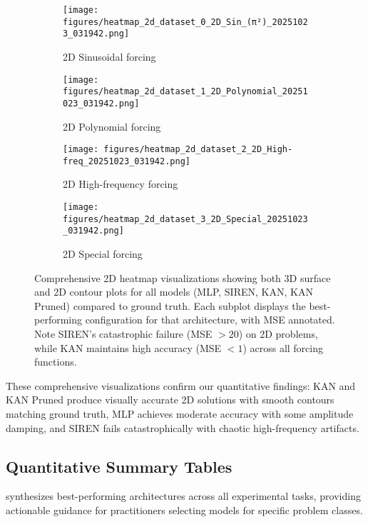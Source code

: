 \documentclass[11pt,a4paper]{article}
\begin{document}
\begin{figure}[htbp]
\centering
\begin{subfigure}{0.48\textwidth}
\texttt{[image: figures/heatmap\_2d\_dataset\_0\_2D\_Sin\_(π²)\_20251023\_031942.png]}
\caption{2D Sinusoidal forcing}
\end{subfigure}
\hfill
\begin{subfigure}{0.48\textwidth}
\texttt{[image: figures/heatmap\_2d\_dataset\_1\_2D\_Polynomial\_20251023\_031942.png]}
\caption{2D Polynomial forcing}
\end{subfigure}

\vspace{0.3cm}

\begin{subfigure}{0.48\textwidth}
\texttt{[image: figures/heatmap\_2d\_dataset\_2\_2D\_High-freq\_20251023\_031942.png]}
\caption{2D High-frequency forcing}
\end{subfigure}
\hfill
\begin{subfigure}{0.48\textwidth}
\texttt{[image: figures/heatmap\_2d\_dataset\_3\_2D\_Special\_20251023\_031942.png]}
\caption{2D Special forcing}
\end{subfigure}
\caption{Comprehensive 2D heatmap visualizations showing both 3D surface and 2D contour plots for all models (MLP, SIREN, KAN, KAN Pruned) compared to ground truth. Each subplot displays the best-performing configuration for that architecture, with MSE annotated. Note SIREN's catastrophic failure (MSE $> 20$) on 2D problems, while KAN maintains high accuracy (MSE $< 1$) across all forcing functions.}
\label{fig:2d_heatmaps}
\end{figure}

These comprehensive visualizations confirm our quantitative findings: KAN and KAN Pruned produce visually accurate 2D solutions with smooth contours matching ground truth, MLP achieves moderate accuracy with some amplitude damping, and SIREN fails catastrophically with chaotic high-frequency artifacts.

\subsection{Quantitative Summary Tables}

 synthesizes best-performing architectures across all experimental tasks, providing actionable guidance for practitioners selecting models for specific problem classes.
\end{document}
